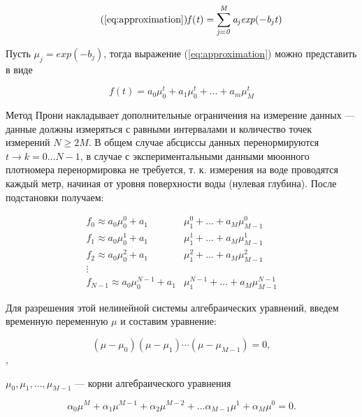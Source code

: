 \begin{equation}
  \tag{\ref{eq:approximation}}
  \mathit{ f(t)  = \displaystyle\sum_{j=0}^M a_j exp(-b_j t) }  
\end{equation}

Пусть $\mu_j = exp(-b_j)$, тогда выражение (\ref{eq:approximation}) можно представить в виде 

\begin{equation}
  \label{eq:prony_nonlinear}
  \mathit{ f(t)  = a_0 \mu_0^t + a_1 \mu_0^t + \ldots + a_m \mu_M^t }
\end{equation}


Метод Прони накладывает дополнительные ограничения на измерение данных --- данные должны измеряться с равными 
интервалами и количество точек измерений $N \geq 2M$. В общем случае абсциссы данных перенормируются $t \to k = 0 \ldots N-1$, 
в случае с экспериментальными данными мюонного плотномера перенормировка не требуется, т. к. измерения на воде
проводятся каждый метр, начиная от уровня поверхности воды (нулевая глубина). После подстановки получаем:

\begin{equation}
  \begin{split}
  f_0  \approx a_0 \mu_0^0 + a_1 & \mu_1^0 + \ldots + a_M \mu_{M-1}^0 \\
  f_1  \approx a_0 \mu_0^1 + a_1 & \mu_1^1 + \ldots + a_M \mu_{M-1}^1  \\
  f_2  \approx a_0 \mu_0^2 + a_1 & \mu_1^2 + \ldots + a_M \mu_{M-1}^2  \\
  \vdots & \\
  f_{N-1} \approx a_0 \mu_{0}^{N-1} + a_1 & \mu_{1}^{N-1} + \ldots + a_M \mu_{M-1}^{N-1}
  \end{split}
  \label{eq:prony_system}
\end{equation}

Для разрешения этой нелинейной системы алгебраических уравнений, введем временную переменную $\mu$ и составим уравнение: 

\begin{equation}
\label{eq:prony_algebra}
	\left( \mu - \mu_0 \right) 
	\left( \mu - \mu_1 \right) \cdots 
	\left( \mu - \mu_{M-1} \right) = 0, 
\end{equation},

$\mu_0,\mu_1, \ldots , \mu_{M-1}$ --- корни алгебраического
уравнения 

\begin{equation}
	\label{eq:prony_alpha}
	\alpha_0 \mu ^ M + 
	\alpha_1 \mu ^ {M-1} + 
	\alpha_2 \mu ^ {M-2} + \ldots
	\alpha_{M-1} \mu ^ 1 + 
	\alpha_{M} \mu ^ 0 = 0.
\end{equation}

